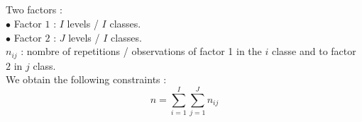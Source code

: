 \documentclass[unknownkeysallowed]{beamer}
\begin{document}
\subsection{}
\begin{frame}
\frametitle{}
Two factors :\\
$\bullet$ Factor $1$ : $I$ levels / $I$ classes.\\
$\bullet$ Factor $2$ : $J$ levels / $I$ classes.\\

$n_{ij}$ : nombre of repetitions / observations of factor 1 in the $i$ classe and to factor $2$ in $j$ class.\\

We obtain the following constraints :
$$n=\sum_{i=1}^{I} \sum_{j=1}^{J} n_{i j}$$
\end{frame}
\end{document}
